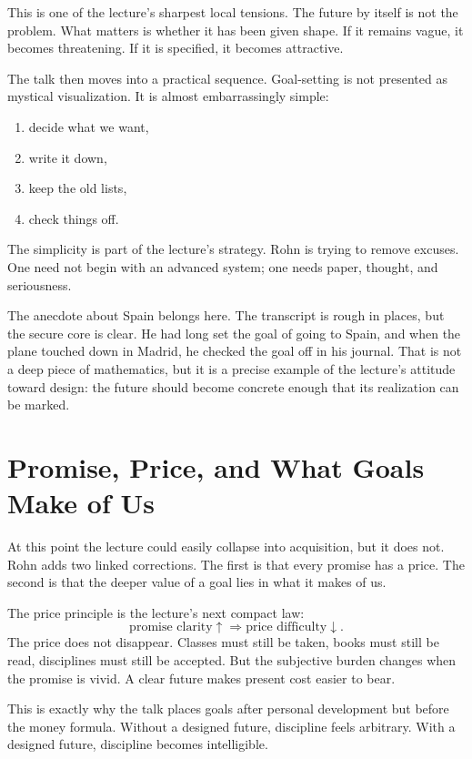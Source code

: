 This is one of the lecture's sharpest local tensions. The future by itself is not the problem. What matters is whether it has been given shape. If it remains vague, it becomes threatening. If it is specified, it becomes attractive.

The talk then moves into a practical sequence. Goal-setting is not presented as mystical visualization. It is almost embarrassingly simple:
\begin{enumerate}
\item decide what we want,
\item write it down,
\item keep the old lists,
\item check things off.
\end{enumerate}
The simplicity is part of the lecture's strategy. Rohn is trying to remove excuses. One need not begin with an advanced system; one needs paper, thought, and seriousness.

The anecdote about Spain belongs here. The transcript is rough in places, but the secure core is clear. He had long set the goal of going to Spain, and when the plane touched down in Madrid, he checked the goal off in his journal. That is not a deep piece of mathematics, but it is a precise example of the lecture's attitude toward design: the future should become concrete enough that its realization can be marked.

\section{Promise, Price, and What Goals Make of Us}

At this point the lecture could easily collapse into acquisition, but it does not. Rohn adds two linked corrections. The first is that every promise has a price. The second is that the deeper value of a goal lies in what it makes of us.

The price principle is the lecture's next compact law:
\begin{equation}
\text{promise clarity}\uparrow \Rightarrow \text{price difficulty}\downarrow.
\end{equation}
The price does not disappear. Classes must still be taken, books must still be read, disciplines must still be accepted. But the subjective burden changes when the promise is vivid. A clear future makes present cost easier to bear.

This is exactly why the talk places goals after personal development but before the money formula. Without a designed future, discipline feels arbitrary. With a designed future, discipline becomes intelligible.

